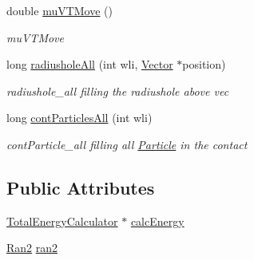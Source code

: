 \begin{DoxyCompactItemize}
double \hyperlink{class_move_creator_a2043489b2a8e9f19e3f00373df9dfece}{mu\+V\+T\+Move} ()
\begin{DoxyCompactList}\small\item\em mu\+V\+T\+Move \end{DoxyCompactList}\item 
long \hyperlink{class_move_creator_a1f797023335091c0f17bcafe03a7693e}{radiushole\+All} (int wli, \hyperlink{class_vector}{Vector} $\ast$position)
\begin{DoxyCompactList}\small\item\em radiushole\+\_\+all filling the radiushole above vec \end{DoxyCompactList}\item 
long \hyperlink{class_move_creator_a12fe5791223c30bbfe06c138e40205b6}{cont\+Particles\+All} (int wli)
\begin{DoxyCompactList}\small\item\em cont\+Particle\+\_\+all filling all \hyperlink{class_particle}{Particle} in the contact \end{DoxyCompactList}\end{DoxyCompactItemize}
\subsection*{Public Attributes}
\begin{DoxyCompactItemize}
\item 
\hyperlink{class_total_energy_calculator}{Total\+Energy\+Calculator} $\ast$ \hyperlink{class_move_creator_ac60e9b10f19291781e8e3b668044aef9}{calc\+Energy}
\item 
\hyperlink{class_ran2}{Ran2} \hyperlink{class_move_creator_addcd872d90fcfd53bc0ffd83b1b5a770}{ran2}
\end{DoxyCompactItemize}
